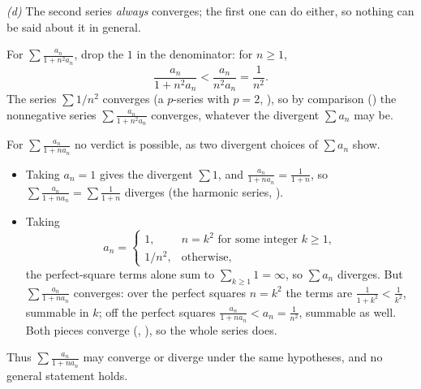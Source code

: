 \documentclass[main.tex]{subfiles}
\begin{document}
\begin{SolutionBlue}
\emph{(d)} The second series \emph{always} converges; the first one can do either, so nothing can be
said about it in general.

For $\sum\frac{a_n}{1+n^2a_n}$, drop the $1$ in the denominator: for $n\ge 1$,
\[
\frac{a_n}{1+n^2a_n}<\frac{a_n}{n^2a_n}=\frac{1}{n^2}.
\]
The series $\sum 1/n^2$ converges (a $p$-series with $p=2$, ), so by comparison
() the nonnegative series $\sum\frac{a_n}{1+n^2a_n}$ converges, whatever the divergent
$\sum a_n$ may be.

For $\sum\frac{a_n}{1+na_n}$ no verdict is possible, as two divergent choices of $\sum a_n$ show.
\begin{itemize}[leftmargin=1.4em,itemsep=2pt,topsep=2pt]
  \item Taking $a_n=1$ gives the divergent $\sum 1$, and $\frac{a_n}{1+na_n}=\frac{1}{1+n}$, so
        $\sum\frac{a_n}{1+na_n}=\sum\frac{1}{1+n}$ diverges (the harmonic series, ).
  \item Taking
        \[
        a_n=\begin{cases}1, & n=k^2\text{ for some integer }k\ge 1,\\[2pt] 1/n^2, & \text{otherwise,}\end{cases}
        \]
        the perfect-square terms alone sum to $\sum_{k\ge1}1=\infty$, so $\sum a_n$ diverges. But
        $\sum\frac{a_n}{1+na_n}$ converges: over the perfect squares $n=k^2$ the terms are
        $\frac{1}{1+k^2}<\frac{1}{k^2}$, summable in $k$; off the perfect squares
        $\frac{a_n}{1+na_n}<a_n=\frac{1}{n^2}$, summable as well. Both pieces converge
        (, ), so the whole series does.
\end{itemize}
Thus $\sum\frac{a_n}{1+na_n}$ may converge or diverge under the same hypotheses, and no general
statement holds.
\end{SolutionBlue}
\end{document}
